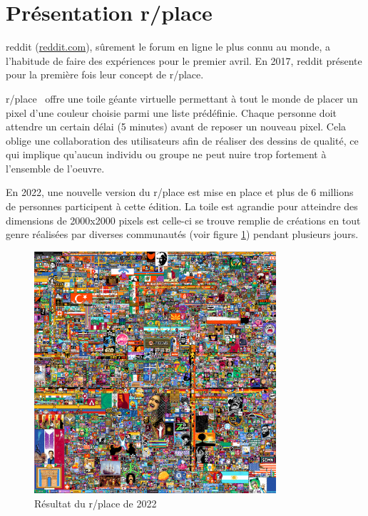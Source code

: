\section{Présentation r/place}
\gls{reddit} (\href{https://www.reddit.com}{reddit.com}), sûrement le forum en ligne le plus connu au monde, a l'habitude de faire des expériences pour le premier avril. En 2017, \gls{reddit} présente pour la première fois leur concept de r/place.

r/place~\cite{rplace} offre une toile géante virtuelle permettant à tout le monde de placer un pixel d'une couleur choisie parmi une liste prédéfinie. Chaque personne doit attendre un certain délai (5 minutes) avant de reposer un nouveau pixel. Cela oblige une collaboration des utilisateurs afin de réaliser des dessins de qualité, ce qui implique qu'aucun individu ou groupe ne peut nuire trop fortement à l'ensemble de l'oeuvre.

En 2022, une nouvelle version du r/place est mise en place et plus de 6 millions de personnes participent à cette édition. La toile est agrandie pour atteindre des dimensions de 2000x2000 pixels est celle-ci se trouve remplie de créations en tout genre réalisées par diverses communautés (voir figure \ref{fig:rplace2022}) pendant plusieurs jours.

\begin{figure}[H]
  \centering
  \includegraphics[width=0.8\textwidth]{./assets/figures/rplace.png}
  \caption{Résultat du r/place de 2022}
  \label{fig:rplace2022}
\end{figure}

